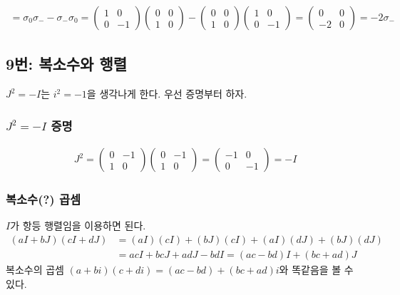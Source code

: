 \begin{align*}
[\sigma_0, \sigma_-]=\sigma_0\sigma_--\sigma_-\sigma_0=
\begin{pmatrix}
1 & 0 \\
0 & -1
\end{pmatrix}
\begin{pmatrix}
0 & 0 \\
1 & 0
\end{pmatrix}-
\begin{pmatrix}
0 & 0 \\
1 & 0
\end{pmatrix}
\begin{pmatrix}
1 & 0 \\
0 & -1
\end{pmatrix}=
\begin{pmatrix}
0 & 0 \\
-2 & 0
\end{pmatrix}=-2\sigma_-
\end{align*}

\subsection{9번: 복소수와 행렬}
$J^2=-I$는 $i^2=-1$을 생각나게 한다. 우선 증명부터 하자.

\subsubsection{$J^2=-I$ 증명}
\begin{align*}
J^2=
\begin{pmatrix}
0 & -1\\
1 & 0
\end{pmatrix}
\begin{pmatrix}
0 & -1\\
1 & 0
\end{pmatrix}=
\begin{pmatrix}
-1 & 0\\
0 & -1
\end{pmatrix}=-I
\end{align*}

\subsubsection{복소수(?) 곱셈}
$I$가 항등 행렬임을 이용하면 된다.
\begin{align*}
(aI+bJ)(cI+dJ)&=(aI)(cI)+(bJ)(cI)+(aI)(dJ)+(bJ)(dJ)\\
&=acI+bcJ+adJ-bdI=(ac-bd)I+(bc+ad)J
\end{align*}
복소수의 곱셈 $(a+bi)(c+di)=(ac-bd)+(bc+ad)i$와 똑같음을 볼 수 있다. 
